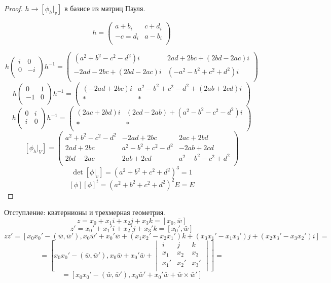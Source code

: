 \begin{proof}
$h \to [\phi_h|_v]$ в базисе из матриц Пауля.

$$
h = \begin{pmatrix}
a + b_i & c + d_i\\
-c = d_i & a - b_i\\
\end{pmatrix}
$$ 

$$ 
h \begin{pmatrix}
i & 0\\
0 & -i\\
\end{pmatrix}
h^{-1} 
= 
\begin{pmatrix}
(a^2 + b^2 - c^2 -d^2)i & 2ad + 2bc + (2bd - 2ac)i\\
-2ad - 2bc + (2bd - 2ac)i & (-a^2 -b^2 + c^2 + d^2)i\\
\end{pmatrix}
$$
$$
h
\begin{pmatrix}
0 & 1\\
-1 & 0\\
\end{pmatrix}
h^{-1} = 
\begin{pmatrix}
(-2ad + 2bc)i & a^2 - b^2 + c^2 - d^2 + (2ab + 2cd)i\\
*&*\\
\end{pmatrix}
$$
$$
h 
\begin{pmatrix}
0 & i\\
i & 0\\
\end{pmatrix}
h^{-1} = 
\begin{pmatrix}
(2ac + 2bd)i & (2cd - 2ab) + (a^2 - b^2 - c^2 - d^2)i\\
*&*\\
\end{pmatrix}
$$
$$
[\phi_h|_{V}] = 
\begin{pmatrix}
a^2 + b^2 - c^2 - d^2 & -2ad + 2bc & 2ac + 2bd\\
2ad + 2bc & a^2 - b^2 + c^2 - d^2 & -2ab + 2cd\\
2bd - 2ac & 2ab + 2cd & a^2 - b^2 - c^2 + d^2\\
\end{pmatrix}
$$
$$\det [\phi|_{v}] = (a^2 + b^2 + c^2 + d^2)^3 = 1$$
$$[\phi][\phi]^t = (a^2 + b^2 + c^2 + d^2)^2E = E$$
\end{proof}

Отступление: кватернионы и трехмерная геометрия. 
$$z = x_0 + x_1i + x_2j + x_3k = [x_0, \bar w]$$
$$z' = x_0' + x_1'i + x_2'j + x_3'k = [x_0', \bar w]$$
$$zz' = [x_0x_0' - (\bar w, \bar w'), x_0\bar w' + x_0'\bar w + (x_1x_2' - x_2 x_1')k + (x_3x_1' - x_1x_3')j + (x_2x_3' - x_3x_2')i]  =$$
$$= [x_0x_0' - (\bar w, \bar w'), x_0\bar w + x_0'\bar w + \begin{vmatrix}
i & j & k\\
x_1 & x_2 & x_3\\
x_1' & x_2' & x_3'\\
\end{vmatrix}] =$$
$$= [x_0x_0' - (\bar w, \bar w'), x_0\bar w' + x_0'\bar w + \bar w \times \bar w'] $$

